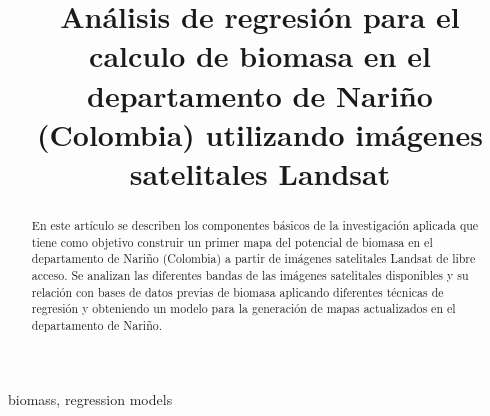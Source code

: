 \documentclass[conference]{IEEEtran}
\begin{document}
\pagestyle{empty}  


\title{Análisis de regresión para el calculo de biomasa en el departamento de Nariño (Colombia) utilizando imágenes satelitales Landsat}

\author{
\and
{}
}

\maketitle

\begin{abstract}

En este artículo se describen los componentes básicos de 
la investigación aplicada que tiene como objetivo construir un
primer mapa del potencial de biomasa en el departamento de Nariño (Colombia) a
partir de imágenes satelitales Landsat de libre acceso. Se 
analizan las diferentes bandas de las imágenes satelitales disponibles y
su relación con bases de datos previas de biomasa aplicando diferentes técnicas de regresión y obteniendo un modelo
para la generación de mapas actualizados en el departamento de Nariño.

\end{abstract}
 


\begin{IEEEkeywords}
biomass, regression models 
\end{IEEEkeywords}

\thispagestyle{empty} 

\IEEEpeerreviewmaketitle










\ifCLASSOPTIONcompsoc
\end{document}
